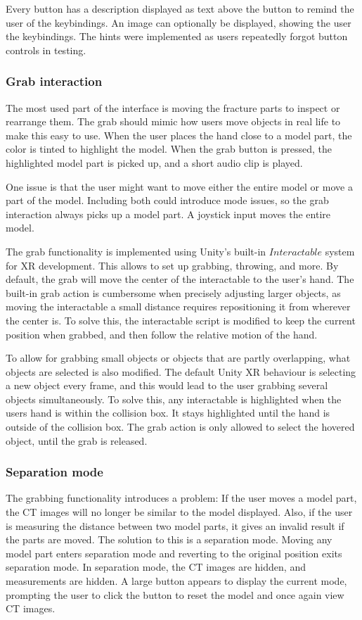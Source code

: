 \documentclass[a4paper]{report}
\begin{document}
Every button has a description displayed as text above the button to remind the user of the keybindings. An image can optionally be displayed, showing the user the keybindings. The hints were implemented as users repeatedly forgot button controls in testing.

\subsubsection{Grab interaction}

The most used part of the interface is moving the fracture parts to inspect or rearrange them. The grab should mimic how users move objects in real life to make this easy to use. When the user places the hand close to a model part, the color is tinted to highlight the model. When the grab button is pressed, the highlighted model part is picked up, and a short audio clip is played.

One issue is that the user might want to move either the entire model or move a part of the model. Including both could introduce mode issues\cite{nngroup}, so the grab interaction always picks up a model part. A joystick input moves the entire model.

The grab functionality is implemented using Unity's built-in $Interactable$ system for XR\cite{noauthor_xr_nodate} development. This allows to set up grabbing, throwing, and more. 
By default, the grab will move the center of the interactable to the user's hand. The built-in grab action is cumbersome when precisely adjusting larger objects, as moving the interactable a small distance requires repositioning it from wherever the center is. 
To solve this, the interactable script is modified to keep the current position when grabbed, and then follow the relative motion of the hand.

To allow for grabbing small objects or objects that are partly overlapping, what objects are selected is also modified. The default Unity XR behaviour is selecting a new object every frame, and this would lead to the user grabbing several objects simultaneously. To solve this, any interactable is highlighted when the users hand is within the collision box. It stays highlighted until the hand is outside of the collision box. The grab action is only allowed to select the hovered object, until the grab is released.


\subsubsection{Separation mode}
The grabbing functionality introduces a problem: If the user moves a model part, the CT images will no longer be similar to the model displayed. Also, if the user is measuring the distance between two model parts, it gives an invalid result if the parts are moved. 
The solution to this is a separation mode. Moving any model part enters separation mode and reverting to the original position exits separation mode. In separation mode, the CT images are hidden, and measurements are hidden. A large button appears to display the current mode, prompting the user to click the button to reset the model and once again view CT images.
\end{document}
